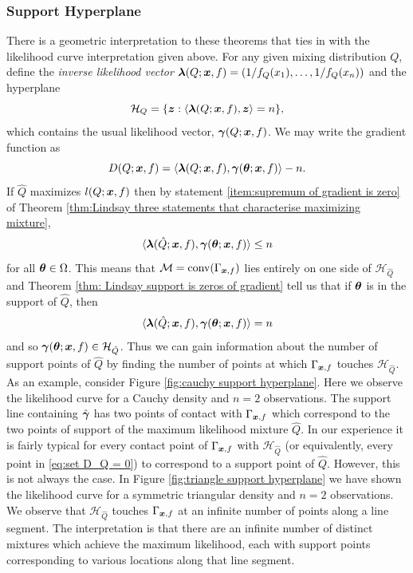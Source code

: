	\subsubsection{Support Hyperplane}
	\label{sec: support hyperplane}
	There is a geometric interpretation to these theorems that ties in with the likelihood curve interpretation given above. For any given mixing distribution $Q$, define the \emph{inverse likelihood vector} ${\bm{{\lambda}}}(Q;{\bm{{x}}},f) = (1/f_Q(x_1),\dots, 1/f_Q(x_n))$ and the hyperplane
	\begin{equation}
		\mathcal{H}_{Q} = \{{\bm{{z}}} : \langle {\bm{{\lambda}}}(Q;{\bm{{x}}},f), {\bm{{z}}}\rangle = n\},
	\end{equation}
	which contains the usual likelihood vector, ${\bm{{\gamma}}}(Q;{\bm{{x}}}, f)$. We may write the gradient function as
	\begin{equation}
		D(Q;{\bm{{x}}},f) = \langle {\bm{{\lambda}}}(Q;{\bm{{x}}},f), {\bm{{\gamma}}}({\bm{{\theta}}};{\bm{{x}}},f)\rangle - n.
	\end{equation}
	If $\hat{Q}$ maximizes $l(Q;{\bm{{x}}},f)$ then by statement \ref{item:supremum of gradient is zero} of Theorem \ref{thm:Lindsay three statements that characterise maximizing mixture}, 
	\begin{equation}
		\langle {\bm{{\lambda}}}(\hat{Q};{\bm{{x}}},f), {\bm{{\gamma}}}({\bm{{\theta}}};{\bm{{x}}},f) \rangle \leq n
	\end{equation}
	for all ${\bm{{\theta}}} \in \Omega$. This means that $\mathcal{M} = \mathrm{conv}(\Gamma_{{\bm{{x}}},f})$ lies entirely on one side of $\mathcal{H}_{\hat{Q}}$ and Theorem \ref{thm: Lindsay support is zeros of gradient} tell us that if ${\bm{{\theta}}}$ is in the support of $\hat{Q}$, then 
	\begin{equation}
		\langle {\bm{{\lambda}}}(\hat{Q};{\bm{{x}}},f), {\bm{{\gamma}}}({\bm{{\theta}}};{\bm{{x}}},f) \rangle = n
	\end{equation}
	and so ${\bm{{\gamma}}}({\bm{{\theta}}};{\bm{{x}}},f) \in \mathcal{H}_{\hat{Q}}$. Thus we can gain information about the number of support points of $\hat{Q}$ by finding the number of points at which $\Gamma_{{\bm{{x}}},f}$ touches $\mathcal{H}_{\hat{Q}}$. As an example, consider Figure \ref{fig:cauchy support hyperplane}. Here we observe the likelihood curve for a Cauchy density and $n = 2$ observations. The support line containing $\hat{{\bm{{\gamma}}}}$ has two points of contact with $\Gamma_{{\bm{{x}}}, f}$ which correspond to the two points of support of the maximum likelihood mixture $\hat{Q}$. In our experience it is fairly typical for every contact point of $\Gamma_{{\bm{{x}}}, f}$ with $\mathcal{H}_{\hat{Q}}$ (or equivalently, every point in \eqref{eq:set D_Q = 0}) to correspond to a support point of $\hat{Q}$. However, this is not always the case. In Figure \ref{fig:triangle support hyperplane} we have shown the likelihood curve for a symmetric triangular density and $n =2$ observations. We observe that $\mathcal{H}_{\hat{Q}}$ touches $\Gamma_{{\bm{{x}}}, f}$ at an infinite number of points along a line segment. The interpretation is that there are an infinite number of distinct mixtures which achieve the maximum likelihood, each with support points corresponding to various locations along that line segment.

